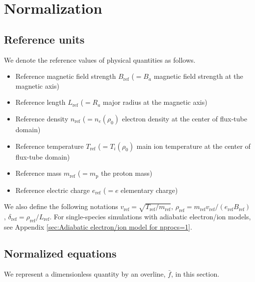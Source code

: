\chapter{Normalization}
\label{chap:Normalization}

\section{Reference units}
\label{sec:Reference units}
We denote the reference values of physical quantities as follows.
\begin{itemize}
\item Reference magnetic field strength $B_\mathrm{ref}$ ($=B_a$ magnetic field strength at the magnetic axis)%
\item Reference length $L_\mathrm{ref}$ ($=R_a$ major radius at the magnetic axis)%
\item Reference density $n_\mathrm{ref}$ ($=n_e(\rho_0)$ electron density at the center of flux-tube domain)%
\item Reference temperature $T_\mathrm{ref}$ ($=T_i(\rho_0)$ main ion temperature at the center of flux-tube domain)%
\item Reference mass $m_\mathrm{ref}$ ($=m_\mathrm{p}$ the proton mass)%
\item Reference electric charge $e_\mathrm{ref}$ ($=e$ elementary charge)%
\end{itemize}
We also define the following notations $v_\mathrm{ref} = \sqrt{T_\mathrm{ref} / m_\mathrm{ref}}$, $\rho_\mathrm{ref} = m_\mathrm{ref} v_\mathrm{ref} / (e_\mathrm{ref} B_\mathrm{ref})$, $\delta_\mathrm{ref} = \rho_\mathrm{ref} / L_\mathrm{ref}$. For single-species simulations with adiabatic electron/ion models, see Appendix \ref{sec:Adiabatic electron/ion model for nprocs=1}.

\section{Normalized equations}
\label{sec:Normalized equations}
We represent a dimensionless quantity by an overline, $\bar f$, in this section.


